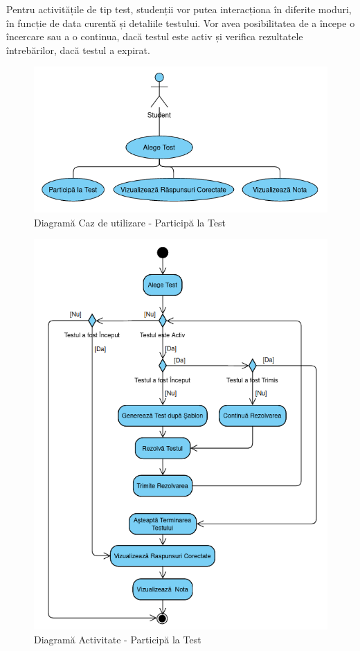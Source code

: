\documentclass[12pt, a4paper, oneside, romanian]{teza-upb}
\begin{document}
Pentru activitățile de tip test, studenții vor putea interacționa în diferite moduri, în funcție de data curentă și detaliile testului. Vor avea posibilitatea de a începe o încercare sau a o continua, dacă testul este activ și verifica rezultatele întrebărilor, dacă testul a expirat. 

\begin{figure}[H]
\centering
\includegraphics*[width=0.75\columnwidth]{diagrama-use-case-participa-la-test}
\caption{Diagramă Caz de utilizare - Participă la Test}
\label{diagrama-use-case-participa-la-test}
\end{figure}


\begin{figure}[H]
\centering
\includegraphics*[width=0.75\columnwidth]{diagrama-activitate-participa-la-test}
\caption{Diagramă Activitate - Participă la Test}
\label{diagrama-activitate-participa-la-test}
\end{figure}
\end{document}
